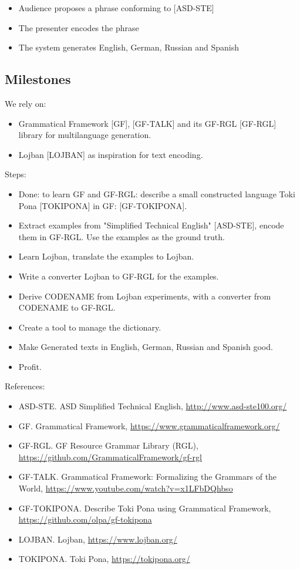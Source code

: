 \documentclass{article}
\begin{document}
\begin{itemize}
\item Audience proposes a phrase conforming to [ASD-STE]
\item The presenter encodes the phrase
\item The system generates English, German, Russian and Spanish
\end{itemize}

\subsection{Milestones}

We rely on:

\begin{itemize}
\item Grammatical Framework [GF], [GF-TALK] and its GF-RGL [GF-RGL] library for multilanguage generation.
\item Lojban [LOJBAN] as inspiration for text encoding.
\end{itemize}

Steps:

\begin{itemize}
\item Done: to learn GF and GF-RGL: describe a small constructed language Toki Pona [TOKIPONA] in GF: [GF-TOKIPONA].
\item Extract examples from "Simplified Technical English" [ASD-STE], encode them in GF-RGL. Use the examples as the ground truth.
\item Learn Lojban, translate the examples to Lojban.
\item Write a converter Lojban to GF-RGL for the examples.
\item Derive CODENAME from Lojban experiments, with a converter from CODENAME to GF-RGL.
\item Create a tool to manage the dictionary.
\item Make Generated texts in English, German, Russian and Spanish good.
\item Profit.
\end{itemize}

References:

\begin{itemize}
\item ASD-STE. ASD Simplified Technical English, \url{http://www.asd-ste100.org/}
\item GF. Grammatical Framework, \url{https://www.grammaticalframework.org/}
\item GF-RGL. GF Resource Grammar Library (RGL), \url{https://github.com/GrammaticalFramework/gf-rgl}
\item GF-TALK. Grammatical Framework: Formalizing the Grammars of the World, \url{https://www.youtube.com/watch?v=x1LFbDQhbso}
\item GF-TOKIPONA. Describe Toki Pona using Grammatical Framework, \url{https://github.com/olpa/gf-tokipona}
\item LOJBAN. Lojban, \url{https://www.lojban.org/}
\item TOKIPONA. Toki Pona, \url{https://tokipona.org/}
\end{itemize}
\end{document}
